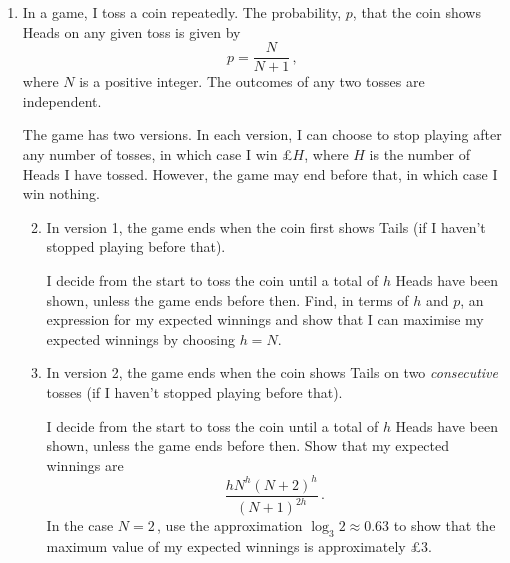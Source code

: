\documentclass[a4, 11pt]{report}
\newlength{\qspace}
\newcounter{qnumber}
\newenvironment{question}%
 {\vspace{\qspace}
  \begin{enumerate}[\bfseries 1\quad][10]%
    \setcounter{enumi}{\value{qnumber}}%
    \item%
 }
{
  \end{enumerate}
  \filbreak
  \stepcounter{qnumber}
 }
\newenvironment{questionparts}[1][1]%
 {
  \begin{enumerate}[\bfseries (i)]%
    \setcounter{enumii}{#1}
    \addtocounter{enumii}{-1}
    \setlength{\itemsep}{5mm}
    \setlength{\parskip}{5pt}
 }
 {
  \end{enumerate}
 }
\begin{document}
\begin{question}
In  a game,  I toss a coin repeatedly. The probability, $p$, that
the coin shows Heads on any given toss is given by
\[
p= \frac N{N+1}
\,,
\]
where  $N$ is a positive integer.
The outcomes of any two tosses
are independent.  

The game has two versions.
 In each version, I can choose to 
stop playing after any number of tosses, in which case 
I win \pounds$H$, where $H$ is the number of Heads I have tossed. However,
the game may end before that, in which case I win nothing.
 
\begin{questionparts}
\item In version 1, the game ends when
the coin first shows Tails 
(if I haven't stopped playing before that).

I decide from the start  to  toss the coin until  
a total of $h$ Heads have been shown, unless the game ends before then. 
Find, in terms of $h$ and $p$, 
an expression for my expected winnings and show that
I can  maximise my 
expected
winnings by choosing $h=N$.  

\item In version 2, the game ends when the coin shows Tails on 
two {\em consecutive} tosses
(if I haven't stopped playing before that).

I decide from the start  to  toss the coin until  
a total of $h$ Heads have been shown, unless the game ends before then. 
Show that my expected winnings  
are 
\[
\frac{ hN^h (N+2)^h}{(N+1)^{2h}}
\,.
\]
In the case 
$N=2\,$,
use the approximation $\log_3 2 \approx 0.63$ to  show that 
the maximum value of my expected winnings is approximately \pounds 3.



\end{questionparts}
\end{question}




\end{document}
